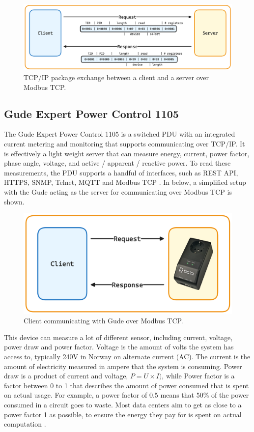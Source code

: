 \documentclass[
  table]{report}
\begin{document}
\begin{figure}[H]
\centering
  \includegraphics{assets/3-modbus-tcp.png}
  \caption{TCP/IP package exchange between a client and a server over Modbus
TCP.}
  \label{fig:modbus-tcp}
\end{figure}

\subsection{Gude Expert Power Control 1105}

The Gude Expert Power Control 1105 is a switched PDU with an integrated
current metering and monitoring that supports communicating over TCP/IP.
It is effectively a light weight server that can measure energy,
current, power factor, phase angle, voltage, and active / apparent /
reactive power. To read these measurements, the PDU supports a handful
of interfaces, such as REST API, HTTPS, SNMP, Telnet, \ac{MQTT} and
Modbus TCP \citep{gmbhExpertPowerControl2023}. In
 below, a simplified setup with the Gude acting
as the server for communicating over Modbus TCP is shown.

\begin{figure}[H]
\centering
  \includegraphics[width=0.7\columnwidth]{assets/3-modbus-gude.png}
  \caption{Client communicating with Gude over Modbus TCP.}
  \label{fig:gude-control}
\end{figure}

This device can measure a lot of different sensor, including current,
voltage, power draw and power factor. Voltage is the amount of volts the
system has access to, typically 240V in Norway on alternate current
(AC). The current is the amount of electricity measured in ampere that
the system is consuming. Power draw is a product of current and voltage,
\(P = U \times I)\), while Power factor is a factor between 0 to 1 that
describes the amount of power consumed that is spent on actual usage.
For example, a power factor of 0.5 means that 50\% of the power consumed
in a circuit goes to waste. Most data centers aim to get as close to a
power factor 1 as possible, to ensure the energy they pay for is spent
on actual computation \citep{rasmussenImpactLeadingPower2020}.
\end{document}
